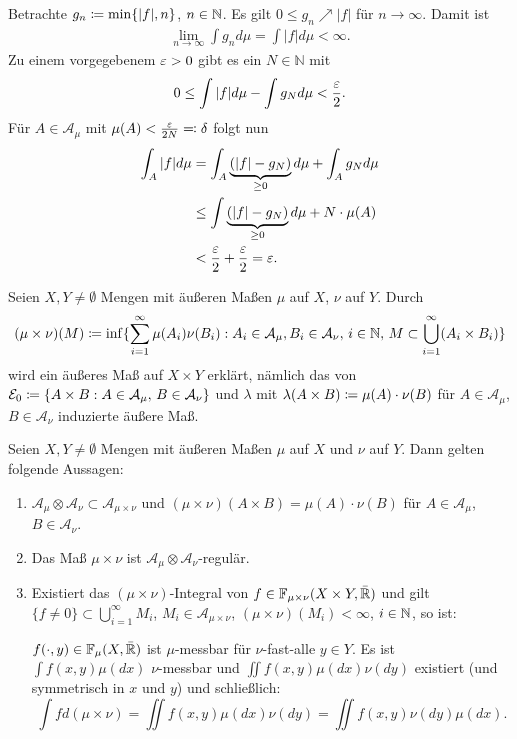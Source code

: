 \documentclass[a4paper,twoside,DIV15,BCOR12mm]{scrbook}
\newcommand{\A}{\mathcal A}
\begin{document}
\begin{beweis}
Betrachte $g_n\da \min\{|f|,n\}$, $n\in\mathbb{N}$. Es gilt $0\le g_n\nearrow |f|$ für $n\to\infty$. Damit ist
\begin{align*}
\lim_{n\to \infty} \int g_n d\mu = \int |f| d\mu <\infty.
\end{align*}
Zu einem vorgegebenem $\varepsilon>0$ gibt es ein $N\in\mathbb{N}$ mit 
\begin{align*}
0\le \int |f|d\mu - \int g_N d\mu < \frac{\varepsilon}2.
\end{align*}
Für $A\in\A_\mu$ mit $\mu(A) < \frac\ep{2N} \ad \delta$ folgt nun
\begin{align*}
\int_A |f| d\mu
&= \int_A\underbrace{(|f|-g_N)}_{\ge 0} d\mu + \int _A g_N d\mu \\
&\le \int\underbrace{(|f|-g_N)}_{\ge 0} d\mu + N \cdot \mu(A) \\
&< \frac{\varepsilon}2 + \frac{\varepsilon}2 = \varepsilon.
\end{align*}
\end{beweis}

Seien $X,Y\neq\emptyset$ Mengen mit äußeren Maßen $\mu$ auf $X$, $\nu$ auf $Y$. Durch
\[
(\mu \times \nu)(M) \da \inf\{ \sum_{i=1}^\infty \mu(A_i)\nu(B_i): A_i\in \A_\mu, B_i\in \A_\nu,\, i\in\MdN,\, M\subset \bigcup_{i=1}^\infty (A_i \times B_i)\}
\]
wird ein äußeres Maß auf $X\times Y$ erklärt, nämlich das von $\mathcal E_0 \da \{A \times B : A\in\A_\mu,\, B\in\A_\nu\}$ und $\lambda$ mit $\lambda(A\times B) \da \mu(A)\cdot \nu(B)$ für $A\in\A_\mu$, $B\in\A_\nu$ induzierte äußere Maß.

\begin{satz}
Seien $X,Y\ne \emptyset$ Mengen mit äußeren Maßen $\mu$ auf $X$ und $\nu$ auf $Y$. Dann gelten folgende Aussagen:
\begin{enumerate}
\item $\A_\mu \otimes \A_\nu \subset \A_{\mu\times \nu}$ und $(\mu\times \nu)(A\times B) = \mu(A) \cdot \nu(B)$ für $A\in\A_\mu$, $B\in\A_\nu$.
\item Das Maß $\mu\times\nu$ ist $\A_\mu \otimes \A_\nu$-regulär.
\item Existiert das $(\mu \times \nu)$-Integral von $f\in\mathbb F_{\mu\times\nu}(X\times Y,\bar{\mathbb{R}})$ und gilt $\{f\ne 0\}\subset \bigcup_{i=1}^\infty M_i$, $M_i\in\A_{\mu\times\nu}$, $(\mu\times\nu)(M_i)<\infty$, $i\in\mathbb{N}$, so ist:

$f(\cdot,y) \in\mathbb F_\mu(X,\bar{\mathbb{R}})$ ist $\mu$-messbar für $\nu$-fast-alle $y\in Y$. Es ist $\int f(x,y)\mu(dx)$ $\nu$-messbar und $\iint f(x,y)\mu(dx)\nu(dy)$ existiert (und symmetrisch in $x$ und $y$) und schließlich:
\[
\int f d(\mu\times\nu) = \iint f(x,y)\mu(dx)\nu(dy) = \iint f(x,y) \nu(dy) \mu(dx).
\]
\end{enumerate}
\end{satz}
\end{document}
